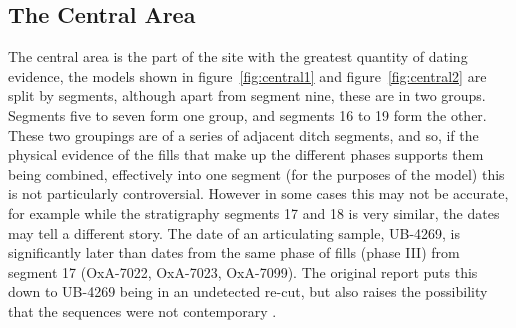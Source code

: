 \subsection{The Central Area}
The central area is the part of the site with the greatest quantity of dating evidence, the models shown in figure~\ref{fig:central1} and figure~\ref{fig:central2} are split by segments, although apart from segment nine, these are in two groups. Segments five to seven form one group, and segments 16 to 19 form the other. These two groupings are of a series of adjacent ditch segments, and so, if the physical evidence of the fills that make up the different phases supports them being combined, effectively into one segment (for the purposes of the model) this is not particularly controversial. However in some cases this may not be accurate, for example while the stratigraphy segments 17 and 18 is very similar, the dates may tell a different story. The date of an articulating sample, UB-4269, is significantly later than dates from the same phase of fills (phase III) from segment 17 (OxA-7022, OxA-7023, OxA-7099). The original report puts this down to UB-4269 being in an undetected re-cut, but also raises the possibility that the sequences were not contemporary \cite[399]{Mercer:2008fk}. 

